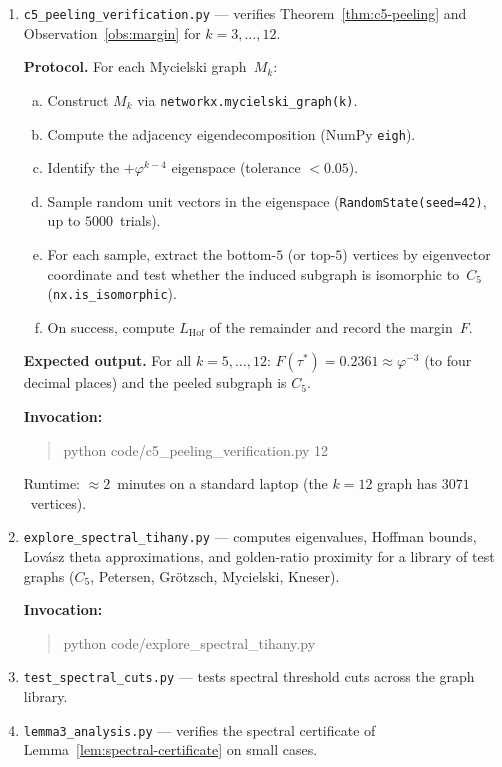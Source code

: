 \documentclass[11pt,a4paper]{amsart}
\theoremstyle{plain}
\theoremstyle{definition}
\theoremstyle{remark}
\newcommand{\vp}{\varphi}
\newcommand{\LHof}{L_{\mathrm{Hof}}}
\begin{document}
\begin{enumerate}[\bfseries S1.]
\item \texttt{c5\_peeling\_verification.py} --- verifies Theorem~\ref{thm:c5-peeling}
  and Observation~\ref{obs:margin} for $k = 3,\ldots,12$.

  \textbf{Protocol.}  For each Mycielski graph~$M_k$:
  \begin{enumerate}[(a)]
  \item Construct $M_k$ via \texttt{networkx.mycielski\_graph(k)}.
  \item Compute the adjacency eigendecomposition (NumPy \texttt{eigh}).
  \item Identify the $+\vp^{k-4}$ eigenspace (tolerance $<0.05$).
  \item Sample random unit vectors in the eigenspace
    (\texttt{RandomState(seed=42)}, up to $5000$~trials).
  \item For each sample, extract the bottom-$5$ (or top-$5$) vertices by
    eigenvector coordinate and test whether the induced subgraph is
    isomorphic to~$C_5$ (\texttt{nx.is\_isomorphic}).
  \item On success, compute $\LHof$ of the remainder and record the
    margin~$F$.
  \end{enumerate}

  \textbf{Expected output.}  For all $k = 5,\ldots,12$:
  $F(\tau^*) = 0.2361 \approx \vp^{-3}$ (to four decimal places) and the
  peeled subgraph is $C_5$.

  \textbf{Invocation:}
  \begin{quote}\ttfamily
  python code/c5\_peeling\_verification.py 12
  \end{quote}
  Runtime: $\approx 2$~minutes on a standard laptop (the $k = 12$ graph has
  $3071$~vertices).

\item \texttt{explore\_spectral\_tihany.py} --- computes eigenvalues, Hoffman
  bounds, Lov\'asz theta approximations, and golden-ratio proximity for a
  library of test graphs ($C_5$, Petersen, Gr\"otzsch, Mycielski, Kneser).

  \textbf{Invocation:}
  \begin{quote}\ttfamily
  python code/explore\_spectral\_tihany.py
  \end{quote}

\item \texttt{test\_spectral\_cuts.py} --- tests spectral threshold cuts
  across the graph library.

\item \texttt{lemma3\_analysis.py} --- verifies the spectral certificate of
  Lemma~\ref{lem:spectral-certificate} on small cases.
\end{enumerate}
\end{document}
